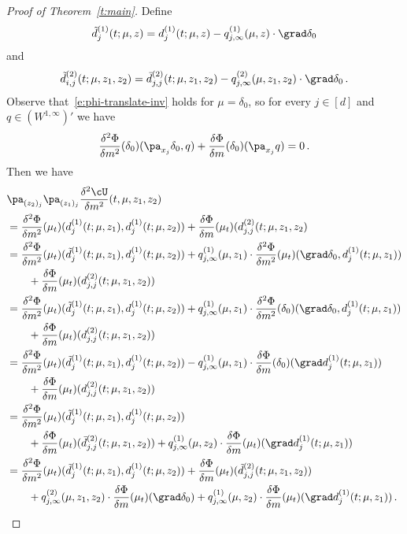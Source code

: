 \documentclass{amsart}
\begin{document}
\begin{proof}[Proof of Theorem~\ref{t:main}]
	Define
	\begin{equation*}
		\tilde d^{(1)}_j(t;\mu,z) = d^{(1)}_j(t;\mu,z) - q^{(1)}_{j,\infty}(\mu,z) \cdot \grad \delta_0 
	\end{equation*}
	and 
	\begin{equation*}
		\tilde d^{(2)}_{i,j}(t;\mu,z_1,z_2) = \bar d^{(2)}_{j,j}(t;\mu,z_1,z_2) - q^{(2)}_{j,\infty}(\mu,z_1,z_2) \cdot \grad \delta_0 \,.
	\end{equation*}
	Observe that~\eqref{e:phi-translate-inv} holds for $\mu = \delta_0$, so for every $j \in [d]$ and $q \in (W^{1,\infty})'$ we have
	\begin{equation}
		\frac{\delta^2 \Phi}{\delta m^2} (\delta_0) (\pa_{x_j} \delta_0, q) + \frac{\delta \Phi}{\delta m}(\delta_0) (\pa_{x_j} q) = 0 \,.
	\end{equation}
	Then we have 
	\begin{align*}
		& \pa_{(z_2)_j} \pa_{(z_1)_j} \frac{\delta^2 \cU}{\delta m^2} (t,\mu,z_1,z_2) \\
		& = \frac{\delta^2 \Phi}{\delta m^2}(\mu_t) (d^{(1)}_j(t;\mu,z_1), d^{(1)}_j(t;\mu,z_2)) + \frac{\delta \Phi}{\delta m} (\mu_t) (d^{(2)}_{j,j}(t;\mu,z_1,z_2) \\
		& = \frac{\delta^2 \Phi}{\delta m^2}(\mu_t) (\tilde d^{(1)}_j(t;\mu,z_1), d^{(1)}_j(t;\mu,z_2)) + q^{(1)}_{j,\infty}(\mu,z_1) \cdot \frac{\delta^2 \Phi}{\delta m^2}(\mu_t) (\grad \delta_0, d^{(1)}_j(t;\mu,z_1)) \\
		& \qquad + \frac{\delta \Phi}{\delta m} (\mu_t) (d^{(2)}_{j,j}(t;\mu,z_1,z_2)) \\
		& = \frac{\delta^2 \Phi}{\delta m^2}(\mu_t) (\tilde d^{(1)}_j(t;\mu,z_1), d^{(1)}_j(t;\mu,z_2)) + q^{(1)}_{j,\infty}(\mu,z_1) \cdot \frac{\delta^2 \Phi}{\delta m^2}(\delta_0) (\grad \delta_0, d^{(1)}_j(t;\mu,z_1)) \\
		& \qquad + \frac{\delta \Phi}{\delta m} (\mu_t) (d^{(2)}_{j,j}(t;\mu,z_1,z_2)) \\
		& = \frac{\delta^2 \Phi}{\delta m^2}(\mu_t) (\tilde d^{(1)}_j(t;\mu,z_1), d^{(1)}_j(t;\mu,z_2)) - q^{(1)}_{j,\infty}(\mu,z_1) \cdot \frac{\delta \Phi}{\delta m}(\delta_0) (\grad d^{(1)}_j(t;\mu,z_1)) \\
		& \qquad + \frac{\delta \Phi}{\delta m} (\mu_t) (d^{(2)}_{j,j}(t;\mu,z_1,z_2)) \\
		& = \frac{\delta^2 \Phi}{\delta m^2}(\mu_t) (\tilde d^{(1)}_j(t;\mu,z_1), d^{(1)}_j(t;\mu,z_2)) \\
		& \qquad + \frac{\delta \Phi}{\delta m} (\mu_t) (\bar d^{(2)}_{j,j}(t;\mu,z_1,z_2)) + q^{(1)}_{j,\infty}(\mu,z_2) \cdot \frac{\delta \Phi}{\delta m}(\mu_t) (\grad d^{(1)}_j(t;\mu,z_1)) \\
		& = \frac{\delta^2 \Phi}{\delta m^2}(\mu_t) (\tilde d^{(1)}_j(t;\mu,z_1), d^{(1)}_j(t;\mu,z_2)) + \frac{\delta \Phi}{\delta m} (\mu_t) (\tilde d^{(2)}_{j,j}(t;\mu,z_1,z_2)) \\
		& \qquad + q^{(2)}_{j,\infty}(\mu,z_1,z_2) \cdot \frac{\delta \Phi}{\delta m}(\mu_t) (\grad \delta_0) + q^{(1)}_{j,\infty}(\mu,z_2) \cdot \frac{\delta \Phi}{\delta m}(\mu_t) (\grad d^{(1)}_j(t;\mu,z_1)) \,.
	\end{align*}
	

\end{proof}
\end{document}
